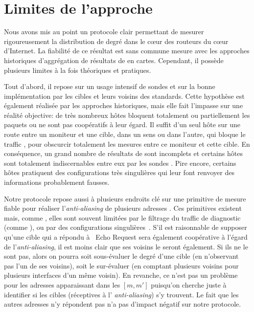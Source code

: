 \section{Limites de l'approche}
\label{sec:traceroute-limits}

Nous avons mis au point un protocole clair permettant de mesurer rigoureusement
la distribution de degré dans le c\oe{}ur des routeurs du c\oe{}ur d'Internet.
La fiabilité de ce résultat est sans commune mesure avec les approches
historiques d'aggrégation de résultats de \traceroute en cartes. Cependant, il
possède plusieurs limites à la fois théoriques et pratiques.

Tout d'abord, il repose sur un usage intensif de sondes \icmp et sur la bonne
implémentation par les cibles et leurs voisins des standards. Cette hypothèse
est également réalisée par les approches historiques, mais elle fait l'impasse
sur une réalité objective: de très nombreux hôtes bloquent totalement ou
partiellement les paquets \icmp ou ne sont pas coopératifs à leur égard. Il
suffit d'un seul hôte sur une route entre un moniteur et une cible, dans un sens
ou dans l'autre, qui bloque le traffic \icmp, pour obscurcir totalement les
mesures entre ce moniteur et cette cible. En conséquence, un grand nombre de
résultats de \traceroute sont incomplets et certains hôtes sont totalement
indiscernables entre eux par les sondes \icmp.
Pire encore, certains hôtes pratiquent des configurations très singulières qui
leur font renvoyer des informations probablement fausses.

Notre protocole repose aussi à plusieurs endroits clé sur une primitive de
mesure fiable pour réaliser l'{\em anti-aliasing} de plusieurs adresses \ip. Ces
primitives existent~\cite{GunesS09,keys2010internet} mais, comme \traceroute,
elles sont souvent limitées par le filtrage du traffic de diagnostic (comme
\icmp), ou par des configurations singulières~\cite{alias-bias}. S'il est
raisonnable de supposer qu'une cible qui a répondu à \icmp~{\sc Echo Request}
sera également coopérative à l'égard de l'{\em anti-aliasing}, il est moins
clair que ses voisins le seront également.
Si ils ne le sont pas, alors on pourra soit sous-évaluer le degré d'une cible
(en n'observant pas l'un de ses voisins), soit le sur-évaluer (en comptant
plusieurs voisins pour plusieurs interfaces d'un même voisin). En revanche, ce
n'est pas un problème pour les adresses apparaissant dans les $[m, m']$
puisqu'on cherche juste à identifier si les cibles (réceptives à l'{\em
anti-aliasing}) s'y trouvent. Le fait que les autres adresses n'y répondent pas
n'a pas d'impact négatif sur notre protocole.

